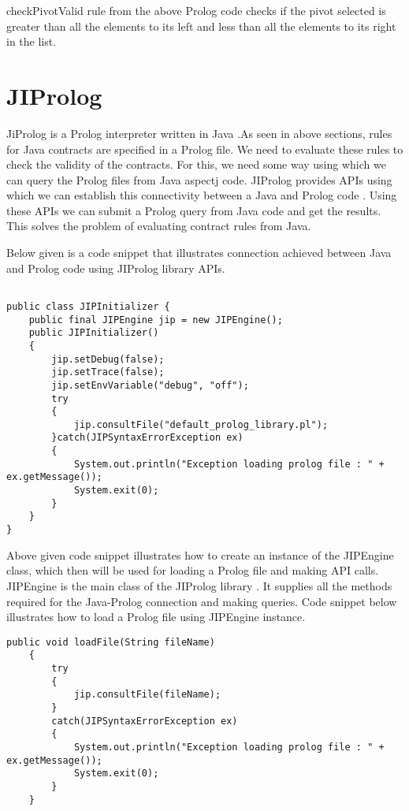 checkPivotValid rule from the above Prolog code checks if the pivot selected is greater than all the elements to its left and less than all the elements to its right in the list.

\section{JIProlog}

JiProlog is a Prolog interpreter written in Java \cite{JIProlog}.As seen in above sections, rules for Java contracts are specified in a Prolog file. We need to evaluate these rules to check the validity of the contracts. For this, we need some way using which we can query the Prolog files from Java aspectj code.
JIProlog provides APIs using which we can establish this connectivity between a Java and Prolog code \cite{JIProlog}. Using these APIs we can submit a Prolog query from Java code and get the results. This solves the problem of evaluating contract rules from Java.

\begin{minipage}{\linewidth}
Below given is a code snippet that illustrates connection achieved between Java and Prolog code using JIProlog library APIs.

\lstset{language=Java,caption=Creating JIPEngine instance, captionpos=b, breaklines=true}       
\begin{lstlisting}[frame=single]

public class JIPInitializer {
	public final JIPEngine jip = new JIPEngine(); 
	public JIPInitializer()
	{
		jip.setDebug(false);
		jip.setTrace(false);
		jip.setEnvVariable("debug", "off");
		try
		{
			jip.consultFile("default_prolog_library.pl");	
		}catch(JIPSyntaxErrorException ex)
		{
			System.out.println("Exception loading prolog file : " + ex.getMessage());
		    System.exit(0);
		}
	}
}
\end{lstlisting}
\end{minipage}

Above given code snippet illustrates how to create an instance of the JIPEngine class, which then will be used for loading a Prolog file and making API calls. JIPEngine is the main class of the JIProlog library \cite{JIProlog}. It supplies all the methods required for the Java-Prolog connection and making queries. Code snippet below illustrates how to load a Prolog file using JIPEngine instance.
\begin{minipage}{\linewidth}
\lstset{language=Java,caption=Loading a Prolog file using JIProlog API, captionpos=b, breaklines=true}       
\begin{lstlisting}[frame=single]
public void loadFile(String fileName)
	{
		try
		{
			jip.consultFile(fileName);
		}
		catch(JIPSyntaxErrorException ex)
		{
			System.out.println("Exception loading prolog file : " + ex.getMessage());
			System.exit(0);
		}
	}
\end{lstlisting}
\end{minipage}

